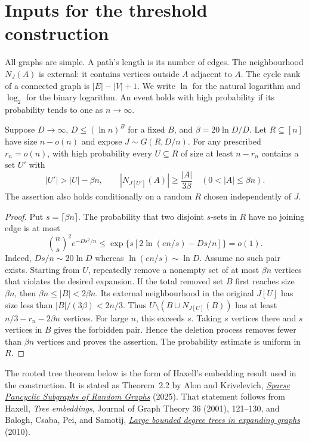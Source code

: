 \section{Inputs for the threshold construction}
\label{sec:rhost-threshold-tools}

All graphs are simple.
A path's length is its number of edges.
The neighbourhood $N_J(A)$ is external: it contains vertices outside $A$ adjacent to $A$.
The cycle rank of a connected graph is $|E|-|V|+1$.
We write $\ln$ for the natural logarithm and $\log_2$ for the binary logarithm.
An event holds with high probability if its probability tends to one as $n\to\infty$.

\begin{lemma}\label{lem:rhost-threshold-expansion}
Suppose $D\to\infty$, $D\le(\ln n)^B$ for a fixed $B$, and $\beta=20\ln D/D$.
Let $R\subseteq[n]$ have size $n-o(n)$ and expose $J\sim G(R,D/n)$.
For any prescribed $r_n=o(n)$, with high probability every $U\subseteq R$ of size at least $n-r_n$
contains a set $U'$ with
\[
 |U'|>|U|-\beta n,\qquad
 |N_{J[U']}(A)|\ge\frac{|A|}{3\beta}
 \quad(0<|A|\le\beta n).
\]
The assertion also holds conditionally on a random $R$ chosen independently of $J$.
\end{lemma}

\begin{proof}
Put $s=\lceil\beta n\rceil$.
The probability that two disjoint $s$-sets in $R$ have no joining edge is at most
\[
 \binom ns^2e^{-Ds^2/n}
 \le\exp\{s[2\ln(en/s)-Ds/n]\}=o(1).
\]
Indeed, $Ds/n\sim20\ln D$ whereas $\ln(en/s)\sim\ln D$.
Assume no such pair exists.
Starting from $U$, repeatedly remove a nonempty set of at most $\beta n$ vertices that violates the desired expansion.
If the total removed set $B$ first reaches size $\beta n$, then $\beta n\le|B|<2\beta n$.
Its external neighbourhood in the original $J[U]$ has size less than $|B|/(3\beta)<2n/3$.
Thus $U\setminus(B\cup N_{J[U]}(B))$ has at least $n/3-r_n-2\beta n$ vertices.
For large $n$, this exceeds $s$.
Taking $s$ vertices there and $s$ vertices in $B$ gives the forbidden pair.
Hence the deletion process removes fewer than $\beta n$ vertices and proves the assertion.
The probability estimate is uniform in $R$.
\end{proof}

The rooted tree theorem below is the form of Haxell's embedding result used in the construction.
It is stated as Theorem~2.2 by Alon and Krivelevich,
\href{https://doi.org/10.1137/23M1598969}{\emph{Sparse Pancyclic Subgraphs of Random Graphs}} (2025).
That statement follows from Haxell, \emph{Tree embeddings}, Journal of Graph Theory 36 (2001), 121--130,
and Balogh, Csaba, Pei, and Samotij,
\href{https://doi.org/10.37236/278}{\emph{Large bounded degree trees in expanding graphs}} (2010).

